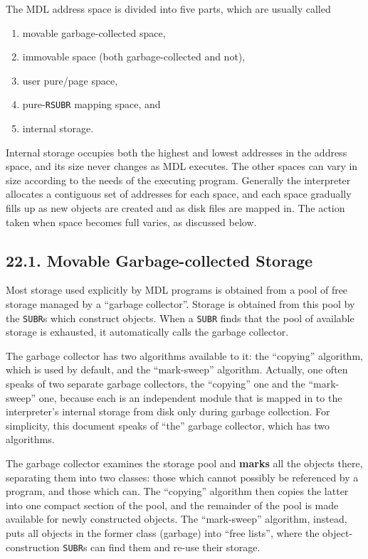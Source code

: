\documentclass[a4paper,]{article}
\providecommand{\tightlist}{%
  \setlength{\itemsep}{0pt}\setlength{\parskip}{0pt}}
\begin{document}
The MDL address space is divided into five parts, which are usually called

\begin{enumerate}
\def\labelenumi{\arabic{enumi}.}
\tightlist
\item
  movable garbage-collected space,
\item
  immovable space (both garbage-collected and not),
\item
  user pure/page space,
\item
  pure-\texttt{RSUBR} mapping space, and
\item
  internal storage.
\end{enumerate}

Internal storage occupies both the highest and lowest addresses in the address space, and its size never changes as MDL
executes. The other spaces can vary in size according to the needs of the executing program. Generally the interpreter
allocates a contiguous set of addresses for each space, and each space gradually fills up as new objects are created and as
disk files are mapped in. The action taken when space becomes full varies, as discussed below.

\subsection{22.1. Movable Garbage-collected Storage}\label{movable-garbage-collected-storage}

Most storage used explicitly by MDL programs is obtained from a pool of free storage managed by a ``garbage collector''.
Storage is obtained from this pool by the \texttt{SUBR}s which construct objects. When a \texttt{SUBR} finds that the pool
of available storage is exhausted, it automatically calls the garbage collector.

The garbage collector has two algorithms available to it: the ``copying'' algorithm, which is used by default, and the
``mark-sweep'' algorithm. Actually, one often speaks of two separate garbage collectors, the ``copying'' one and the
``mark-sweep'' one, because each is an independent module that is mapped in to the interpreter's internal storage from disk
only during garbage collection. For simplicity, this document speaks of ``the'' garbage collector, which has two
algorithms.

The garbage collector examines the storage pool and \textbf{marks} all the objects there, separating them into two classes:
those which cannot possibly be referenced by a program, and those which can. The ``copying'' algorithm then copies the
latter into one compact section of the pool, and the remainder of the pool is made available for newly constructed objects.
The ``mark-sweep'' algorithm, instead, puts all objects in the former class (garbage) into ``free lists'', where the
object-construction \texttt{SUBR}s can find them and re-use their storage.
\end{document}
